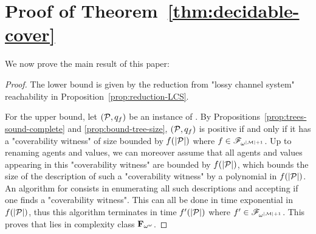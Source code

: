\section{Proof of Theorem~\ref{thm:decidable-cover}}
\label{app:decidable_cover}
We now prove the main result of this paper:

\decidablecover*

\begin{proof}
	The lower bound is given by the reduction from "lossy channel system" reachability in Proposition~\ref{prop:reduction-LCS}.
	
	For the upper bound, let $(\mathcal{P},q_f)$ be an instance of \COVER. By Propositions~\ref{prop:trees-sound-complete} and \ref{prop:bound-tree-size}, $(\mathcal{P},q_f)$ is positive if and only if it has a "coverability witness" of size bounded by $f(|\mathcal{P}|)$ where $f \in \mathscr{F}_{\omega^{|\mathcal{M}|+1}}$. Up to renaming agents and values, we can moreover assume that all agents and values appearing in this "coverability witness" are bounded by $f(|\mathcal{P}|)$, which bounds the size of the description of such a "coverability witness" by a polynomial in $f(|\mathcal{P}|)$.
	An algorithm for \COVER consists in enumerating all such descriptions and accepting if one finds a "coverability witness". 
	This can all be done in time exponential in $f(|\mathcal{P}|)$, thus this algorithm terminates in time $f'(|\mathcal{P}|)$ where $f' \in \mathscr{F}_{\omega^{|\mathcal{M}|+1}}$. This proves that 
	\COVER lies in complexity class $\mathbf{F}_{\omega^\omega}$.
\end{proof}
